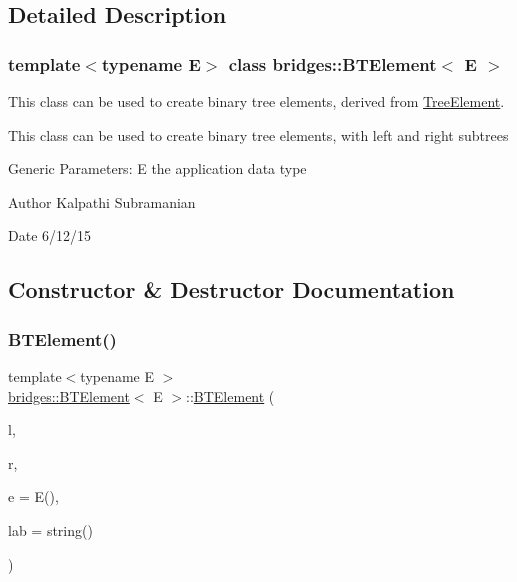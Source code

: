 \subsection{Detailed Description}
\subsubsection*{template$<$typename E$>$\newline
class bridges\+::\+B\+T\+Element$<$ E $>$}

This class can be used to create binary tree elements, derived from \mbox{\hyperlink{classbridges_1_1_tree_element}{Tree\+Element}}. 

This class can be used to create binary tree elements, with left and right subtrees

Generic Parameters\+: E the application data type

\begin{DoxyAuthor}{Author}
Kalpathi Subramanian 
\end{DoxyAuthor}
\begin{DoxyDate}{Date}
6/12/15 
\end{DoxyDate}


\subsection{Constructor \& Destructor Documentation}
\mbox{\label{classbridges_1_1_b_t_element_a8abf38e5d2d70c247de6a6fe6b90bf1b}} 
\subsubsection{\texorpdfstring{B\+T\+Element()}{BTElement()}\hspace{0.1cm}{\footnotesize\ttfamily [1/2]}}
{\footnotesize\ttfamily template$<$typename E $>$ \\
\mbox{\hyperlink{classbridges_1_1_b_t_element}{bridges\+::\+B\+T\+Element}}$<$ E $>$\+::\mbox{\hyperlink{classbridges_1_1_b_t_element}{B\+T\+Element}} (\begin{DoxyParamCaption}\item[{\mbox{\hyperlink{classbridges_1_1_b_t_element}{B\+T\+Element}}$<$ E $>$ $\ast$}]{l,  }\item[{\mbox{\hyperlink{classbridges_1_1_b_t_element}{B\+T\+Element}}$<$ E $>$ $\ast$}]{r,  }\item[{const E \&}]{e = {\ttfamily E()},  }\item[{const string \&}]{lab = {\ttfamily string()} }\end{DoxyParamCaption})\hspace{0.3cm}{\ttfamily [inline]}}

